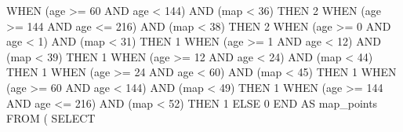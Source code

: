 \documentclass[
  letterpaper,
  DIV=11,
  numbers=noendperiod]{scrartcl}
\newenvironment{Shaded}{\begin{snugshade}}{\end{snugshade}}
\newcommand{\ControlFlowTok}[1]{\textcolor[rgb]{0.00,0.23,0.31}{#1}}
\newcommand{\DecValTok}[1]{\textcolor[rgb]{0.68,0.00,0.00}{#1}}
\newcommand{\KeywordTok}[1]{\textcolor[rgb]{0.00,0.23,0.31}{#1}}
\newcommand{\NormalTok}[1]{\textcolor[rgb]{0.00,0.23,0.31}{#1}}
\newcommand{\OperatorTok}[1]{\textcolor[rgb]{0.37,0.37,0.37}{#1}}
\begin{document}
\begin{Shaded}
\begin{Highlighting}[]
         \ControlFlowTok{WHEN}\NormalTok{ (age }\OperatorTok{\textgreater{}=}  \DecValTok{60} \KeywordTok{AND}\NormalTok{ age }\OperatorTok{\textless{}}  \DecValTok{144}\NormalTok{) }\KeywordTok{AND}\NormalTok{ (map }\OperatorTok{\textless{}} \DecValTok{36}\NormalTok{) }\ControlFlowTok{THEN} \DecValTok{2}
         \ControlFlowTok{WHEN}\NormalTok{ (age }\OperatorTok{\textgreater{}=} \DecValTok{144} \KeywordTok{AND}\NormalTok{ age }\OperatorTok{\textless{}=} \DecValTok{216}\NormalTok{) }\KeywordTok{AND}\NormalTok{ (map }\OperatorTok{\textless{}} \DecValTok{38}\NormalTok{) }\ControlFlowTok{THEN} \DecValTok{2}
         \ControlFlowTok{WHEN}\NormalTok{ (age }\OperatorTok{\textgreater{}=}   \DecValTok{0} \KeywordTok{AND}\NormalTok{ age }\OperatorTok{\textless{}}    \DecValTok{1}\NormalTok{) }\KeywordTok{AND}\NormalTok{ (map }\OperatorTok{\textless{}} \DecValTok{31}\NormalTok{) }\ControlFlowTok{THEN} \DecValTok{1}
         \ControlFlowTok{WHEN}\NormalTok{ (age }\OperatorTok{\textgreater{}=}   \DecValTok{1} \KeywordTok{AND}\NormalTok{ age }\OperatorTok{\textless{}}   \DecValTok{12}\NormalTok{) }\KeywordTok{AND}\NormalTok{ (map }\OperatorTok{\textless{}} \DecValTok{39}\NormalTok{) }\ControlFlowTok{THEN} \DecValTok{1}
         \ControlFlowTok{WHEN}\NormalTok{ (age }\OperatorTok{\textgreater{}=}  \DecValTok{12} \KeywordTok{AND}\NormalTok{ age }\OperatorTok{\textless{}}   \DecValTok{24}\NormalTok{) }\KeywordTok{AND}\NormalTok{ (map }\OperatorTok{\textless{}} \DecValTok{44}\NormalTok{) }\ControlFlowTok{THEN} \DecValTok{1}
         \ControlFlowTok{WHEN}\NormalTok{ (age }\OperatorTok{\textgreater{}=}  \DecValTok{24} \KeywordTok{AND}\NormalTok{ age }\OperatorTok{\textless{}}   \DecValTok{60}\NormalTok{) }\KeywordTok{AND}\NormalTok{ (map }\OperatorTok{\textless{}} \DecValTok{45}\NormalTok{) }\ControlFlowTok{THEN} \DecValTok{1}
         \ControlFlowTok{WHEN}\NormalTok{ (age }\OperatorTok{\textgreater{}=}  \DecValTok{60} \KeywordTok{AND}\NormalTok{ age }\OperatorTok{\textless{}}  \DecValTok{144}\NormalTok{) }\KeywordTok{AND}\NormalTok{ (map }\OperatorTok{\textless{}} \DecValTok{49}\NormalTok{) }\ControlFlowTok{THEN} \DecValTok{1}
         \ControlFlowTok{WHEN}\NormalTok{ (age }\OperatorTok{\textgreater{}=} \DecValTok{144} \KeywordTok{AND}\NormalTok{ age }\OperatorTok{\textless{}=} \DecValTok{216}\NormalTok{) }\KeywordTok{AND}\NormalTok{ (map }\OperatorTok{\textless{}} \DecValTok{52}\NormalTok{) }\ControlFlowTok{THEN} \DecValTok{1}
         \ControlFlowTok{ELSE} \DecValTok{0} \ControlFlowTok{END} \KeywordTok{AS}\NormalTok{ map\_points}
  \KeywordTok{FROM}
\NormalTok{  (}
    \KeywordTok{SELECT}

\end{Highlighting}
\end{Shaded}
\end{document}
